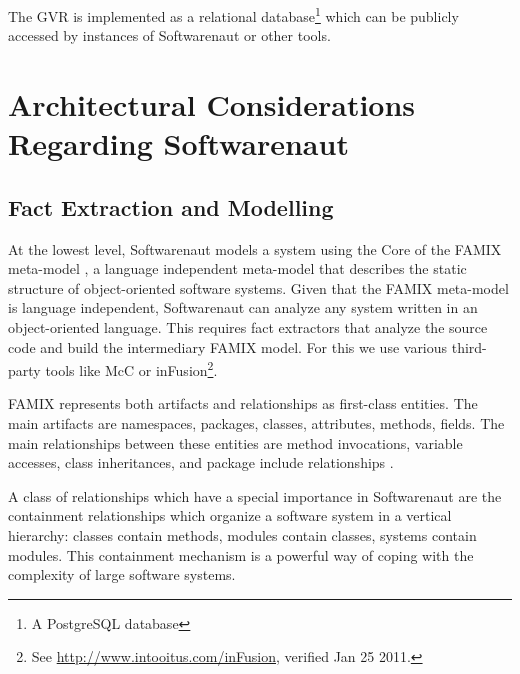 \documentclass[preprint,12pt]{elsarticle}
\begin{document}
The GVR is implemented as a relational database\footnote{A PostgreSQL database} which can be publicly accessed by instances of Softwarenaut or other tools. %








\newpage
\section {Architectural Considerations Regarding Softwarenaut}


\subsection {Fact Extraction and Modelling} \label{sec:facts}

At the lowest level, Softwarenaut models a system using the Core of the FAMIX meta-model \cite{tichelaar-thesis}, a language independent meta-model that describes the static structure of object-oriented software systems. 
Given that the FAMIX meta-model is language independent, Softwarenaut can analyze any system written in an object-oriented language. This requires fact extractors that analyze the source code and build the intermediary FAMIX model. For this we use various third-party tools like McC \cite{pepi-mcc} or inFusion\footnote{See \url{http://www.intooitus.com/inFusion}, verified Jan 25 2011.}.

FAMIX represents both artifacts and relationships as first-class entities. The main artifacts are namespaces, packages, classes, attributes, methods, fields. The main relationships between these entities are method invocations, variable accesses, class inheritances, and package include relationships \cite{tichelaar-thesis}.

A class of relationships which have a special importance in Softwarenaut are the containment relationships which organize a software system in a vertical hierarchy: classes contain methods, modules contain classes, systems contain modules. This containment mechanism is a powerful way of coping with the complexity of large software systems.
\end{document}
